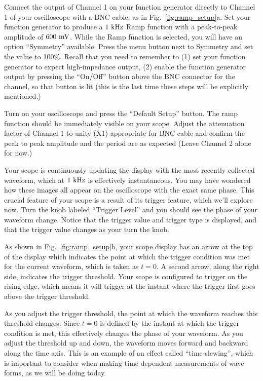 Connect the output of Channel 1 on your function generator directly to
Channel 1 of your oscilloscope with a BNC cable, as in
Fig.~\ref{fig:ramp_setup}a.  Set your function generator to produce a
$1~\rm kHz$ Ramp function with a peak-to-peak amplitude of $600~\rm
mV$. While the Ramp function is selected, you will have an option
``Symmetry'' available.  Press the menu button next to Symmetry and
set the value to 100\%.  Recall that you need to remember to (1) set
your function generator to expect high-impedance output, (2) enable
the function generator output by pressing the ``On/Off'' button above
the BNC connector for the channel, so that button is lit (this is the
last time these steps will be explicitly mentioned.)

Turn on your oscilloscope and press the ``Default Setup'' button.  The
ramp function should be immediately visible on your scope.  Adjust the
attenuation factor of Channel 1 to unity (X1) appropriate for BNC
cable and confirm the peak to peak amplitude and the period are as
expected (Leave Channel 2 alone for now.)

Your scope is continuously updating the display with the most recently
collected waveform, which at $1~\rm kHz$ is effectively instantaneous.
You may have wondered how these images all appear on the oscilloscope
with the exact same phase.  This crucial feature of your scope is a
result of its trigger feature, which we'll explore now.  Turn the knob
labeled ``Trigger Level'' and you should see the phase of your
waveform change. Notice that the trigger value and trigger type is
displayed, and that the trigger value changes as your turn the knob.

As shown in Fig.~\ref{fig:ramp_setup}b, your scope display has an arrow at
the top of the display which indicates the point at which the trigger
condition was met for the current waveform, which is taken as $t=0$.
A second arrow, along the right side, indicates the trigger threshold.
Your scope is configured to trigger on the rising edge, which means it
will trigger at the instant where the trigger first goes above the
trigger threshold.

As you adjust the trigger threshold, the point at which the waveform
reaches this threshold changes.  Since $t=0$ is defined by the instant
at which the trigger condition is met, this effectively changes the
phase of your waveform.  As you adjust the threshold up and down, the
waveform moves forward and backward along the time axis.  This is an
example of an effect called ``time-slewing'', which is important to
consider when making time dependent measurements of wave forms, as we
will be doing today.

